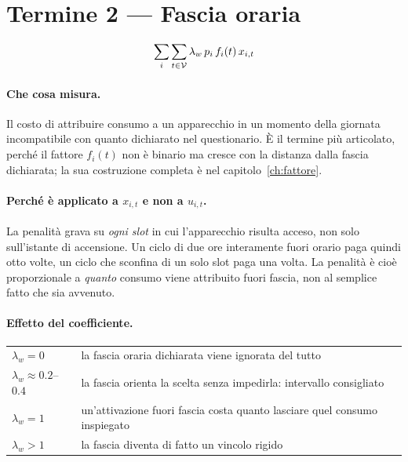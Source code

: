 \section{Termine 2 --- Fascia oraria}
\label{sec:t-fascia}

\begin{equation}
  \sum_{i} \sum_{t \in \mathcal{V}} \lambda_w \, p_i \, f_i(t) \, x_{i,t}
\end{equation}

\paragraph{Che cosa misura.} Il costo di attribuire consumo a un apparecchio in un momento della
giornata incompatibile con quanto dichiarato nel questionario. È il termine più articolato, perché
il fattore $f_i(t)$ non è binario ma cresce con la distanza dalla fascia dichiarata; la sua
costruzione completa è nel capitolo~\ref{ch:fattore}.

\paragraph{Perché è applicato a $x_{i,t}$ e non a $u_{i,t}$.} La penalità grava su \emph{ogni
slot} in cui l'apparecchio risulta acceso, non solo sull'istante di accensione. Un ciclo di due ore
interamente fuori orario paga quindi otto volte, un ciclo che sconfina di un solo slot paga una
volta. La penalità è cioè proporzionale a \emph{quanto} consumo viene attribuito fuori fascia, non
al semplice fatto che sia avvenuto.

\paragraph{Effetto del coefficiente.}
\begin{center}
\begin{tabularx}{\textwidth}{@{}l X@{}}
\toprule
$\lambda_w = 0$ & la fascia oraria dichiarata viene ignorata del tutto \\
$\lambda_w \approx 0.2$--$0.4$ & la fascia orienta la scelta senza impedirla: intervallo consigliato \\
$\lambda_w = 1$ & un'attivazione fuori fascia costa quanto lasciare quel consumo inspiegato \\
$\lambda_w > 1$ & la fascia diventa di fatto un vincolo rigido \\
\bottomrule
\end{tabularx}
\end{center}

